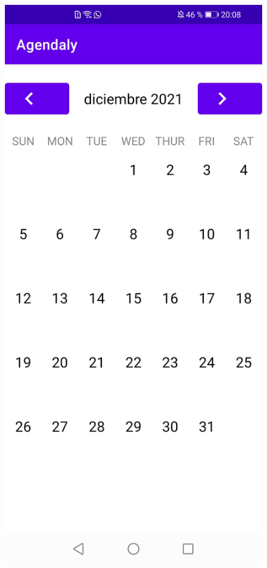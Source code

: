 \documentclass[a4paper,openright,12pt]{article}
\begin{document}
\begin{figure}
            \includegraphics[scale=0.05]{calendarinitview.jpg} \hfill

\end{figure}
\end{document}
